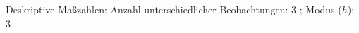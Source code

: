 				\label{tableValues:bstu05i}
				\vspace*{-\baselineskip}
                    \begin{noten}
                	    \note{} Deskriptive Maßzahlen:
                	    Anzahl unterschiedlicher Beobachtungen: 3%
                	    ; 
                	      Modus ($h$): 3
                     \end{noten}


